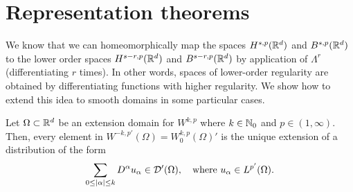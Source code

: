 \documentclass[
    a4paper,
    DIV=14,
    abstract=true,
    numbers=noenddot
]{scrartcl}
\begin{document}
\section{Representation theorems}
We know that we can homeomorphically map the spaces $H^{s,p}(\mathbb{R}^d )$ and $B^{s,p}(\mathbb{R}^d )$ to the lower order spaces $H^{s-r,p}(\mathbb{R}^d )$ and $B^{s-r,p}(\mathbb{R}^d )$ by application of $\Lambda ^r$ (differentiating $r$ times). In other words, spaces of lower-order regularity are obtained by differentiating functions with higher regularity. We show how to extend this idea to smooth domains in some particular cases.

\begin{theorem}\label{riesz representation}
    Let $\Omega \subset \mathbb{R}^d$ be an extension domain for $W^{k,p}$ where   $k \in \mathbb{N}_0$ and $p \in (1,\infty)$. Then, every element in $W^{-k,p'}(\Omega )=W^{k,p}_0(\Omega )'$ is the unique extension of a distribution  of the form
    \begin{align*}
        \sum_{0\leq{\left| \alpha \right|}\leq k} D^\alpha u_\alpha\in \mathcal{D}'(\Omega ),\quad \text{where }    u_\alpha \in L^{p'}(\Omega ).
    \end{align*}

\end{theorem}
\end{document}
